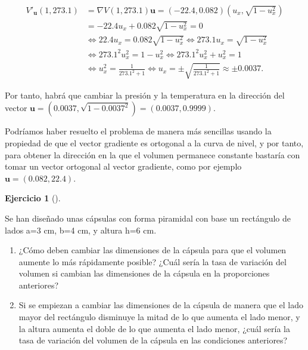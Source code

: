\documentclass[
  a4paper,
]{scrreport}
\theoremstyle{definition}
\newtheorem{exercise}{Ejercicio}[chapter]
\theoremstyle{remark}
\begin{document}
\begin{tcolorbox}
\begin{enumerate}
  \begin{align*}
  V'_{\mathbf{u}}(1,273.1) 
  &= \nabla V(1, 273.1) \mathbf{u}
  = (-22.4, 0.082)(u_x,\sqrt{1-u_x^2}) \\ 
  &= -22.4 u_x + 0.082 \sqrt{1-u_x^2}
  = 0 \\
  &\Leftrightarrow 22.4 u_x = 0.082\sqrt{1-u_x^2}
  \Leftrightarrow 273.1 u_x = \sqrt{1-u_x^2} \\
  &\Leftrightarrow 273.1^2 u_x^2 = 1-u_x^2 
  \Leftrightarrow 273.1^2 u_x^2 + u_x^2 = 1 \\ 
  &\Leftrightarrow u_x^2 = \frac{1}{273.1^2+1}
  \Leftrightarrow u_x = \pm \sqrt{\frac{1}{273.1^2+1}}
  \approx \pm 0.0037.
  \end{align*}

  Por tanto, habrá que cambiar la presión y la temperatura en la
  dirección del vector
  \(\mathbf{u}=(0.0037, \sqrt{1-0.0037^2}) = (0.0037, 0.9999)\).

  Podríamos haber resuelto el problema de manera más sencillas usando la
  propiedad de que el vector gradiente es ortogonal a la curva de nivel,
  y por tanto, para obtener la dirección en la que el volumen permanece
  constante bastaría con tomar un vector ortogonal al vector gradiente,
  como por ejemplo \(\mathbf{u}=(0.082, 22.4)\).
\end{enumerate}

\end{tcolorbox}

\begin{exercise}[]\protect\hypertarget{exr-derivada-direccional-capsulas}{}\label{exr-derivada-direccional-capsulas}

Se han diseñado unas cápsulas con forma piramidal con base un rectángulo
de lados a=3 cm, b=4 cm, y altura h=6 cm.

\begin{enumerate}
\def\labelenumi{\alph{enumi}.}
\item
  ¿Cómo deben cambiar las dimensiones de la cápsula para que el volumen
  aumente lo más rápidamente posible? ¿Cuál sería la tasa de variación
  del volumen si cambian las dimensiones de la cápsula en la
  proporciones anteriores?
\item
  Si se empiezan a cambiar las dimensiones de la cápsula de manera que
  el lado mayor del rectángulo disminuye la mitad de lo que aumenta el
  lado menor, y la altura aumenta el doble de lo que aumenta el lado
  menor, ¿cuál sería la tasa de variación del volumen de la cápsula en
  las condiciones anteriores?
\end{enumerate}

\end{exercise}
\end{document}
